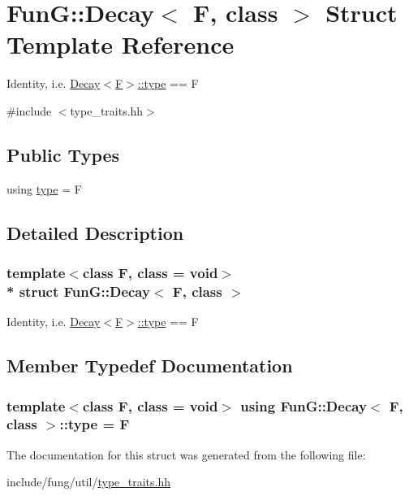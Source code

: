 \hypertarget{structFunG_1_1Decay}{}\section{FunG\+:\+:Decay$<$ F, class $>$ Struct Template Reference}
\label{structFunG_1_1Decay}


Identity, i.\+e. \hyperlink{structFunG_1_1Decay_a4b2916cbb7c8587ab3fccc9b896b9df4}{Decay$<$\+F$>$\+::type} == F  




{\ttfamily \#include $<$type\+\_\+traits.\+hh$>$}

\subsection*{Public Types}
\begin{DoxyCompactItemize}
\item 
using \hyperlink{structFunG_1_1Decay_a4b2916cbb7c8587ab3fccc9b896b9df4}{type} = F
\end{DoxyCompactItemize}


\subsection{Detailed Description}
\subsubsection*{template$<$class F, class = void$>$\\*
struct Fun\+G\+::\+Decay$<$ F, class $>$}

Identity, i.\+e. \hyperlink{structFunG_1_1Decay_a4b2916cbb7c8587ab3fccc9b896b9df4}{Decay$<$\+F$>$\+::type} == F 

\subsection{Member Typedef Documentation}
\subsubsection[{\texorpdfstring{type}{type}}]{\setlength{\rightskip}{0pt plus 5cm}template$<$class F, class  = void$>$ using {\bf Fun\+G\+::\+Decay}$<$ F, class $>$\+::{\bf type} =  F}\hypertarget{structFunG_1_1Decay_a4b2916cbb7c8587ab3fccc9b896b9df4}{}\label{structFunG_1_1Decay_a4b2916cbb7c8587ab3fccc9b896b9df4}


The documentation for this struct was generated from the following file\+:\begin{DoxyCompactItemize}
\item 
include/fung/util/\hyperlink{type__traits_8hh}{type\+\_\+traits.\+hh}\end{DoxyCompactItemize}
